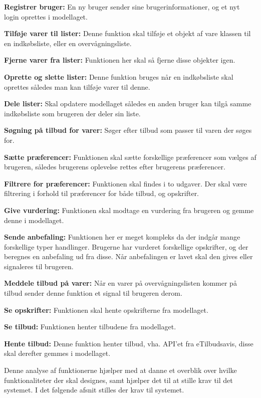 \textbf{Registrer bruger:} En ny bruger sender sine brugerinformationer, og et nyt login oprettes i modellaget.

\textbf{Tilføje varer til lister:} Denne funktion skal tilføje et objekt af vare klassen til en indkøbsliste, eller en overvågningsliste.

\textbf{Fjerne varer fra lister:} Funktionen her skal så fjerne disse objekter igen.

\textbf{Oprette og slette lister:} Denne funktion bruges når en indkøbsliste skal oprettes således man kan tilføje varer til denne.

\textbf{Dele lister:} Skal opdatere modellaget således en anden bruger kan tilgå samme indkøbsliste som brugeren der deler sin liste.

\textbf{Søgning på tilbud for varer:} Søger efter tilbud som passer til varen der søges for.

\textbf{Sætte præferencer:} Funktionen skal sætte forskellige præferencer som vælges af brugeren, således brugerens oplevelse rettes efter brugerens præferencer.

\textbf{Filtrere for præferencer:} Funktionen skal findes i to udgaver. Der skal være filtrering i forhold til præferencer for både tilbud, og opskrifter.

\textbf{Give vurdering:} Funktionen skal modtage en vurdering fra brugeren og gemme denne i modellaget.

\textbf{Sende anbefaling:} Funktionen her er meget kompleks da der indgår mange forskellige typer handlinger.
Brugerne har vurderet forskellige opskrifter, og der beregnes en anbefaling ud fra disse.
Når anbefalingen er lavet skal den gives eller signaleres til brugeren.

\textbf{Meddele tilbud på varer:} Når en varer på overvågningslisten kommer på tilbud sender denne funktion et signal til brugeren derom.

\textbf{Se opskrifter:} Funktionen skal hente opskrifterne fra modellaget.

\textbf{Se tilbud:} Funktionen henter tilbudene fra modellaget.

\textbf{Hente tilbud:} Denne funktion henter tilbud, vha. API'et fra eTilbudsavis, disse skal derefter gemmes i modellaget.

Denne analyse af funktionerne hjælper med at danne et overblik over hvilke funktionaliteter der skal designes, samt hjælper det til at stille krav til det systemet.
I det følgende afsnit stilles der krav til systemet.
